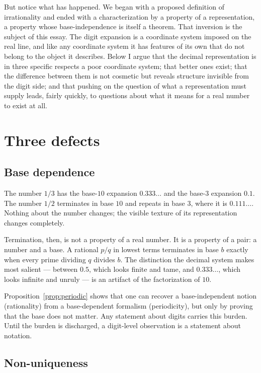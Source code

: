 \documentclass{essay}
\begin{document}
But notice what has happened. We began with a proposed definition of
irrationality and ended with a characterization by a property of a
representation, a property whose base-independence is itself a theorem. That
inversion is the subject of this essay. The digit expansion is a coordinate
system imposed on the real line, and like any coordinate system it has features
of its own that do not belong to the object it describes. Below I argue that
the decimal representation is in three specific respects a poor coordinate
system; that better ones exist; that the difference between them is not
cosmetic but reveals structure invisible from the digit side; and that pushing
on the question of what a representation must supply leads, fairly quickly, to
questions about what it means for a real number to exist at all.

\section{Three defects}

\subsection{Base dependence}

The number \(1/3\) has the base-\(10\) expansion \(0.333\ldots\) and the base-\(3\)
expansion \(0.1\). The number \(1/2\) terminates in base \(10\) and repeats in base
\(3\), where it is \(0.111\ldots\). Nothing about the number changes; the visible
texture of its representation changes completely.

Termination, then, is not a property of a real number. It is a property of a
pair: a number and a base. A rational \(p/q\) in lowest terms terminates in base
\(b\) exactly when every prime dividing \(q\) divides \(b\). The distinction the
decimal system makes most salient --- between \(0.5\), which looks finite and
tame, and \(0.333\ldots\), which looks infinite and unruly --- is an artifact of
the factorization of \(10\).

Proposition~\ref{prop:periodic} shows that one can recover a base-independent
notion (rationality) from a base-dependent formalism (periodicity), but only by
proving that the base does not matter. Any statement about digits carries this
burden. Until the burden is discharged, a digit-level observation is a
statement about notation.

\subsection{Non-uniqueness}
\end{document}
